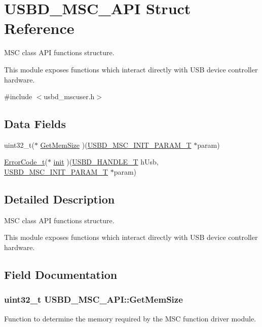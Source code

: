 \hypertarget{structUSBD__MSC__API}{\section{U\-S\-B\-D\-\_\-\-M\-S\-C\-\_\-\-A\-P\-I Struct Reference}
\label{structUSBD__MSC__API}
}


M\-S\-C class A\-P\-I functions structure.

This module exposes functions which interact directly with U\-S\-B device controller hardware.  




{\ttfamily \#include $<$usbd\-\_\-mscuser.\-h$>$}

\subsection*{Data Fields}
\begin{DoxyCompactItemize}
\item 
uint32\-\_\-t($\ast$ \hyperlink{structUSBD__MSC__API_a73a9d240b20fcd83e6d2c9675420d626}{Get\-Mem\-Size} )(\hyperlink{group__USBD__MSC_ga01cbe726c0ee97ee44661ca88d7e8fbd}{U\-S\-B\-D\-\_\-\-M\-S\-C\-\_\-\-I\-N\-I\-T\-\_\-\-P\-A\-R\-A\-M\-\_\-\-T} $\ast$param)
\item 
\hyperlink{error_8h_a905255056c349318139d94aa4523d516}{Error\-Code\-\_\-t}($\ast$ \hyperlink{structUSBD__MSC__API_a2654b01293392f8a58412e88b46f1e91}{init} )(\hyperlink{group__USBD__Core_gafdbb2204d929cb9d75736bd2b42342ac}{U\-S\-B\-D\-\_\-\-H\-A\-N\-D\-L\-E\-\_\-\-T} h\-Usb, \hyperlink{group__USBD__MSC_ga01cbe726c0ee97ee44661ca88d7e8fbd}{U\-S\-B\-D\-\_\-\-M\-S\-C\-\_\-\-I\-N\-I\-T\-\_\-\-P\-A\-R\-A\-M\-\_\-\-T} $\ast$param)
\end{DoxyCompactItemize}


\subsection{Detailed Description}
M\-S\-C class A\-P\-I functions structure.

This module exposes functions which interact directly with U\-S\-B device controller hardware. 



\subsection{Field Documentation}
\hypertarget{structUSBD__MSC__API_a73a9d240b20fcd83e6d2c9675420d626}{
\subsubsection[{Get\-Mem\-Size}]{\setlength{\rightskip}{0pt plus 5cm}uint32\-\_\-t U\-S\-B\-D\-\_\-\-M\-S\-C\-\_\-\-A\-P\-I\-::\-Get\-Mem\-Size}}\label{structUSBD__MSC__API_a73a9d240b20fcd83e6d2c9675420d626}
Function to determine the memory required by the M\-S\-C function driver module.

